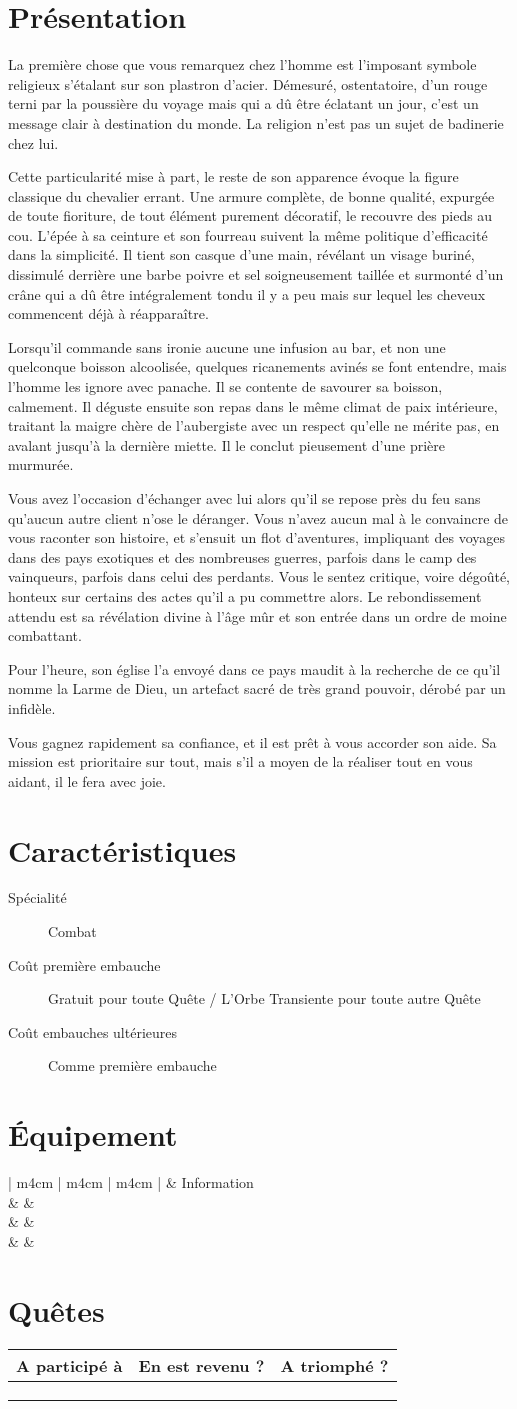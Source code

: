 \documentclass{report}
\newcommand{\hero}[5]{
    \herostats{#1}{#2}{#3}{#4}

    \fullbleed{#5}

    \herosheet
}
\newcommand{\herostats}[4]{
    \section{Présentation}

    #1

    \section{Caractéristiques}

    \begin{description}
        \item[Spécialité] #2
        \item[Coût première embauche] #3
        \item[Coût embauches ultérieures] #4
    \end{description}
}
\newcommand{\herosheet}{
    \section{Équipement}

    \begin{tabular}{ | m{4cm} | m{4cm} | m{4cm} | }
        \hline
        \multicolumn{2}{| m{8cm} |}{Équipement} & Information\\
        \hline
        \mytextfield{4cm} & \mytextfield{4cm} & \mytextfield{4cm}\\
        \hline
        \mytextfield{4cm} & \mytextfield{4cm} & \mytextfield{4cm}\\
        \hline
        \mytextfield{4cm} & \mytextfield{4cm} & \mytextfield{4cm}\\
        \hline
    \end{tabular}

    \section{Quêtes}

    \begin{tabular}{ | m{7cm} | m{2.5cm} | m{2.5cm} |}
        \hline
        A participé à & En est revenu ? & A triomphé ?\\
        \hline
        \mytextfield{7cm} & \mycheckbox & \mycheckbox \\ 
        \hline
        \mytextfield{7cm} & \mycheckbox & \mycheckbox \\ 
        \hline
        \mytextfield{7cm} & \mycheckbox & \mycheckbox \\ 
        \hline
    \end{tabular}
}
\begin{document}
\hero{
La première chose que vous remarquez chez l'homme est l'imposant symbole religieux s'étalant sur son plastron d'acier. Démesuré, ostentatoire, d'un rouge terni par la poussière du voyage mais qui a dû être éclatant un jour, c'est un message clair à destination du monde. La religion n'est pas un sujet de badinerie chez lui.

Cette particularité mise à part, le reste de son apparence évoque la figure classique du chevalier errant. Une armure complète, de bonne qualité, expurgée de toute fioriture, de tout élément purement décoratif, le recouvre des pieds au cou. L'épée à sa ceinture et son fourreau suivent la même politique d'efficacité dans la simplicité. Il tient son casque d'une main, révélant un visage buriné, dissimulé derrière une barbe poivre et sel soigneusement taillée et surmonté d'un crâne qui a dû être intégralement tondu il y a peu mais sur lequel les cheveux commencent déjà à réapparaître.

Lorsqu'il commande sans ironie aucune une infusion au bar, et non une quelconque boisson alcoolisée, quelques ricanements avinés se font entendre, mais l'homme les ignore avec panache. Il se contente de savourer sa boisson, calmement. Il déguste ensuite son repas dans le même climat de paix intérieure, traitant la maigre chère de l'aubergiste avec un respect qu'elle ne mérite pas, en avalant jusqu'à la dernière miette. Il le conclut pieusement d'une prière murmurée.

Vous avez l'occasion d'échanger avec lui alors qu'il se repose près du feu sans qu'aucun autre client n'ose le déranger. Vous n'avez aucun mal à le convaincre de vous raconter son histoire, et s'ensuit un flot d'aventures, impliquant des voyages dans des pays exotiques et des nombreuses guerres, parfois dans le camp des vainqueurs, parfois dans celui des perdants. Vous le sentez critique, voire dégoûté, honteux sur certains des actes qu'il a pu commettre alors. Le rebondissement attendu est sa révélation divine à l'âge mûr et son entrée dans un ordre de moine combattant.

Pour l'heure, son église l'a envoyé dans ce pays maudit à la recherche de ce qu'il nomme la Larme de Dieu, un artefact sacré de très grand pouvoir, dérobé par un infidèle.

Vous gagnez rapidement sa confiance, et il est prêt à vous accorder son aide. Sa mission est prioritaire sur tout, mais s'il a moyen de la réaliser tout en vous aidant, il le fera avec joie.
}{
Combat
}{
Gratuit pour toute Quête \cross / L'Orbe Transiente pour toute autre Quête
}{
Comme première embauche
}{images/templar.jpg}
\end{document}
